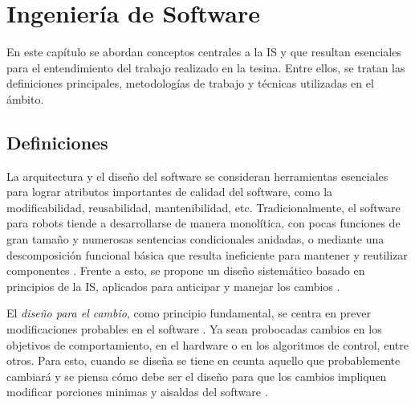 %
%


\chapter{Ingeniería de Software}
\label{ingso}

En este capítulo se abordan conceptos centrales a la \gls{IS} y que resultan esenciales para el entendimiento del trabajo realizado en la tesina. Entre ellos, se tratan las definiciones principales, metodologías de trabajo y técnicas utilizadas en el ámbito.

\section{Definiciones}

La arquitectura y el diseño del software se consideran herramientas esenciales para lograr atributos importantes de calidad del software, como la modificabilidad, reusabilidad, mantenibilidad, etc.\cite{ShawGarlan1996, ghezzi2003, bass2003, DBLP:books/daglib/0030743}
Tradicionalmente, el software para robots tiende a desarrollarse de manera monolítica, con pocas funciones de gran tamaño y numerosas sentencias condicionales anidadas, o mediante una descomposición funcional básica que resulta ineficiente para mantener y reutilizar componentes \cite{code-1,code-2}. Frente a esto, se propone un diseño sistemático basado en principios de la \gls{IS}, aplicados para anticipar y manejar los cambios \cite{Gamma:1995:DPE:186897, DBLP:books/lib/BuschmannHS07}.

El \textit{diseño para el cambio}, como principio fundamental, se centra en prever modificaciones probables en el software \cite{Parnas1972, ShawGarlan1996, ghezzi2003, bass2003, DBLP:books/daglib/0030743}. Ya sean probocadas cambios en los objetivos de comportamiento, en el hardware o en los algoritmos de control, entre otros. Para esto, cuando se diseña se tiene en ceunta aquello que probablemente cambiará y se piensa cómo debe ser el diseño para que los cambios impliquen modificar porciones minimas y aisaldas del software \cite{ghezzi2003}.

